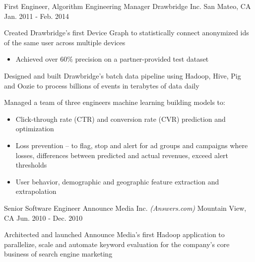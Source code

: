 \begin{cventries}
  \cventry
    {First Engineer, Algorithm Engineering Manager} %
    {Drawbridge Inc.} %
    {San Mateo, CA} %
    {Jan. 2011 - Feb. 2014} %
    {
      \begin{cvitems} %
        \item{Created Drawbridge's first Device Graph to statistically connect anonymized ids of the same user across multiple devices}
          \begin{itemize}[label=$\circ$]
            \item{Achieved over 60\% precision on a partner-provided test dataset}
          \end{itemize}
        \item{Designed and built Drawbridge’s batch data pipeline using Hadoop, Hive, Pig and Oozie to process billions of events in
terabytes of data daily}
        \item{Managed a team of three engineers machine learning building models to:}
          \begin{itemize}[label=$\circ$]
            \item{Click-through rate (CTR) and conversion rate (CVR) prediction and optimization}
            \item{Loss prevention – to flag, stop and alert for ad groups and campaigns where losses, differences between predicted and actual revenues, exceed alert thresholds}
            \item{User behavior, demographic and geographic feature extraction and extrapolation}
          \end{itemize}
      \end{cvitems}
    }

  \cventry
    {Senior Software Engineer} %
    {Announce Media Inc. \bodyfontlight\emph{(Answers.com)}} %
    {Mountain View, CA} %
    {Jun. 2010 - Dec. 2010} %
    {
      \begin{cvitems} %
        \item{Architected and launched Announce Media’s first Hadoop application to parallelize, scale and automate keyword evaluation for the company's core business of search engine marketing}
      \end{cvitems}
    }


\end{cventries}

